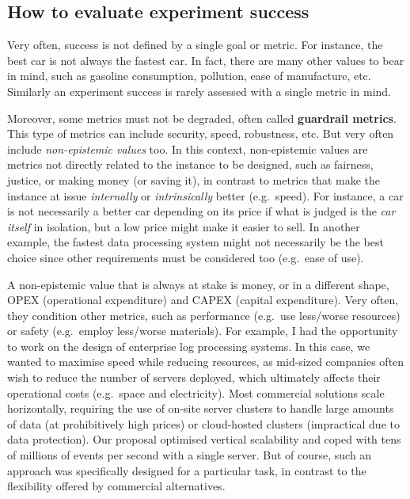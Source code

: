 \documentclass[
  12pt,
]{book}
\begin{document}
\subsection{How to evaluate experiment success}\label{how-to-evaluate-experiment-success}

Very often, success is not defined by a single goal or metric. For instance, the best car is not always the fastest car. In fact, there are many other values to bear in mind, such as gasoline consumption, pollution, ease of manufacture, etc. Similarly an experiment success is rarely assessed with a single metric in mind.

Moreover, some metrics must not be degraded, often called \textbf{guardrail metrics}. This type of metrics can include security, speed, robustness, etc. But very often include \emph{non-epistemic values} too. In this context, non-epistemic values are metrics not directly related to the instance to be designed, such as fairness, justice, or making money (or saving it), in contrast to metrics that make the instance at issue \emph{internally} or \emph{intrinsically} better (e.g.~speed). For instance, a car is not necessarily a better car depending on its price if what is judged is the \emph{car itself} in isolation, but a low price might make it easier to sell. In another example, the fastest data processing system might not necessarily be the best choice since other requirements must be considered too (e.g.~ease of use).

A non-epistemic value that is always at stake is money, or in a different shape, OPEX (operational expenditure) and CAPEX (capital expenditure). Very often, they condition other metrics, such as performance (e.g.~use less/worse resources) or safety (e.g.~employ less/worse materials). For example, I had the opportunity to work on the design of enterprise log processing systems. In this case, we wanted to maximise speed while reducing resources, as mid-sized companies often wish to reduce the number of servers deployed, which ultimately affects their operational costs (e.g.~space and electricity). Most commercial solutions scale horizontally, requiring the use of on-site server clusters to handle large amounts of data (at prohibitively high prices) or cloud-hosted clusters (impractical due to data protection). Our proposal optimised vertical scalability and coped with tens of millions of events per second with a single server. But of course, such an approach was specifically designed for a particular task, in contrast to the flexibility offered by commercial alternatives.
\end{document}

